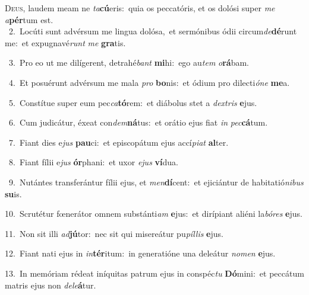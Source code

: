 \lettrine{\initial\textcolor{\initialcolor}{D}}{eus,} laudem meam ne \textit{ta}\-\textbf{cú}eris:~\star quia os peccatóris, et os dolósi super \textit{me} \textit{a}\-\textbf{pér}tum est.\\
{\numbfont\textcolor{\numbcolor}{~2.}}~Locúti sunt advérsum me lingua dolósa,~\dagger et sermónibus ódii circum\-\textit{de}\-\textbf{dé}runt me:~\star et expugnavé\textit{runt} \textit{me} \textbf{gra}\-tis.\par
{\numbfont\textcolor{\numbcolor}{~3.}}~Pro eo ut me dilígerent, detrahé\textit{bant} \textbf{mi}\-hi:~\star ego au\textit{tem} \textit{o}\-\textbf{rá}bam.\par
{\numbfont\textcolor{\numbcolor}{~4.}}~Et posuérunt advérsum me mala \textit{pro} \textbf{bo}\-nis:~\star et ódium pro dilecti\-\textit{ó}\-\textit{ne} \textbf{me}\-a.\par
{\numbfont\textcolor{\numbcolor}{~5.}}~Constítue super eum pec\-\textit{ca}\-\textbf{tó}rem:~\star et diábolus stet a \textit{dex}\-\textit{tris} \textbf{e}\-jus.\par
{\numbfont\textcolor{\numbcolor}{~6.}}~Cum judicátur, éxeat con\-\textit{dem}\-\textbf{ná}tus:~\star et orátio ejus fiat \textit{in} \textit{pec}\-\textbf{cá}tum.\par
{\numbfont\textcolor{\numbcolor}{~7.}}~Fiant dies e\textit{jus} \textbf{pau}\-ci:~\star et episcopátum ejus accí\-\textit{pi}\-\textit{at} \textbf{al}\-ter.\par
{\numbfont\textcolor{\numbcolor}{~8.}}~Fiant fílii e\textit{jus} \textbf{ór}\-phani:~\star et uxor \textit{e}\-\textit{jus} \textbf{ví}\-dua.\par
{\numbfont\textcolor{\numbcolor}{~9.}}~Nutántes transferántur fílii ejus, et \textit{men}\-\textbf{dí}cent:~\star et ejiciántur de habitatió\-\textit{ni}\-\textit{bus} \textbf{su}\-is.\par
{\numbfont\textcolor{\numbcolor}{10.}}~Scrutétur fœnerátor omnem substánti\textit{am} \textbf{e}\-jus:~\star et dirípiant aliéni la\-\textit{bó}\-\textit{res} \textbf{e}\-jus.\par
{\numbfont\textcolor{\numbcolor}{11.}}~Non sit illi \textit{ad}\-\textbf{jú}tor:~\star nec sit qui misereátur pu\-\textit{píl}\-\textit{lis} \textbf{e}\-jus.\par
{\numbfont\textcolor{\numbcolor}{12.}}~Fiant nati ejus in \textit{in}\-\textbf{tér}itum:~\star in generatióne una deleátur \textit{no}\-\textit{men} \textbf{e}\-jus.\par
{\numbfont\textcolor{\numbcolor}{13.}}~In memóriam rédeat iníquitas patrum ejus in conspéc\textit{tu} \textbf{Dó}\-mini:~\star et peccátum matris ejus non \textit{de}\-\textit{le}\textbf{á}tur.\par
